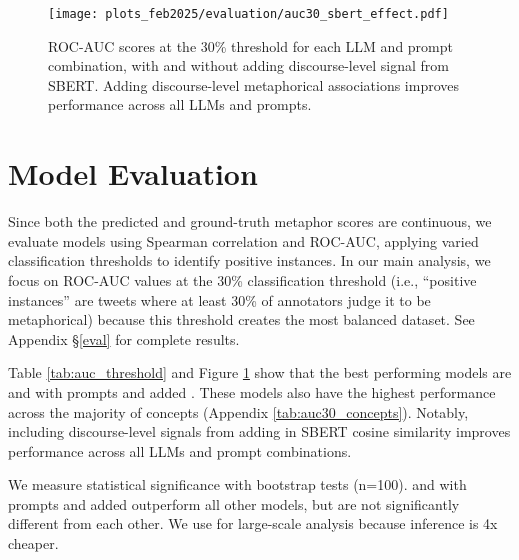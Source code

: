 

\begin{figure}[t!]
    \centering
    \texttt{[image: plots\_feb2025/evaluation/auc30\_sbert\_effect.pdf]}
    \caption{ROC-AUC scores at the 30\% threshold for each LLM and prompt combination, with and without adding discourse-level signal from SBERT. Adding discourse-level metaphorical associations improves performance across all LLMs and prompts.}
    \label{fig:sbert-effect}
\end{figure}

\section{Model Evaluation}

Since both the predicted and ground-truth metaphor scores are continuous, we evaluate models using Spearman correlation and ROC-AUC, applying varied classification thresholds to identify positive instances. 
In our main analysis, we focus on ROC-AUC values at the 30\% classification threshold (i.e., ``positive instances'' are tweets where at least 30\% of annotators judge it to be metaphorical) because this threshold creates the most balanced dataset. 
See Appendix §\ref{eval} for complete results.

Table \ref{tab:auc_threshold} and Figure \ref{fig:sbert-effect} show that the best performing models are  and  with  prompts and added . These models also have the highest performance across the majority of concepts (Appendix \ref{tab:auc30_concepts}). Notably, including discourse-level signals from adding in SBERT cosine similarity improves performance across all LLMs and prompt combinations.

We measure statistical significance with bootstrap tests (n=100).   and  with  prompts and added  outperform all other models, but are not significantly different from each other. We use  for large-scale analysis because inference is 4x cheaper.

